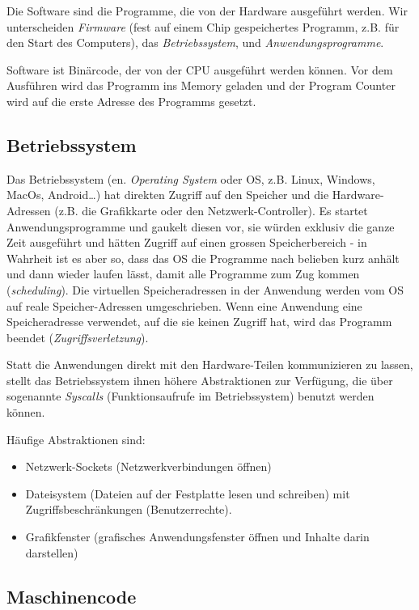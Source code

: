 Die Software sind die Programme, die von der Hardware ausgeführt werden. Wir unterscheiden \emph{Firmware} (fest auf einem Chip gespeichertes Programm, z.B. für den Start des Computers), das \emph{Betriebssystem}, und \emph{Anwendungsprogramme}.

Software ist Binärcode, der von der CPU ausgeführt werden können. Vor dem Ausführen wird das Programm ins Memory geladen und der Program Counter wird auf die erste Adresse des Programms gesetzt.

\subsection{Betriebssystem}

Das Betriebssystem (en. \emph{Operating System} oder OS, z.B. Linux, Windows, MacOs, Android…) hat direkten Zugriff auf den Speicher und die Hardware-Adressen (z.B. die Grafikkarte oder den Netzwerk-Controller). Es startet Anwendungsprogramme und gaukelt diesen vor, sie würden exklusiv die ganze Zeit ausgeführt und hätten Zugriff auf einen grossen Speicherbereich - in Wahrheit ist es aber so, dass das OS die Programme nach belieben kurz anhält und dann wieder laufen lässt, damit alle Programme zum Zug kommen (\emph{scheduling}). Die virtuellen Speicheradressen in der Anwendung werden vom OS auf reale Speicher-Adressen umgeschrieben. Wenn eine Anwendung eine Speicheradresse verwendet, auf die sie keinen Zugriff hat, wird das Programm beendet (\emph{Zugriffsverletzung}). 

Statt die Anwendungen direkt mit den Hardware-Teilen kommunizieren zu lassen, stellt das Betriebssystem ihnen höhere Abstraktionen zur Verfügung, die über sogenannte \emph{Syscalls} (Funktionsaufrufe im Betriebssystem) benutzt werden können.

Häufige Abstraktionen sind:

\begin{itemize}
    \item Netzwerk-Sockets (Netzwerkverbindungen öffnen)
    \item Dateisystem (Dateien auf der Festplatte lesen und schreiben) mit Zugriffsbeschränkungen (Benutzerrechte).
    \item Grafikfenster (grafisches Anwendungsfenster öffnen und Inhalte darin darstellen)
\end{itemize}

\subsection{Maschinencode}

